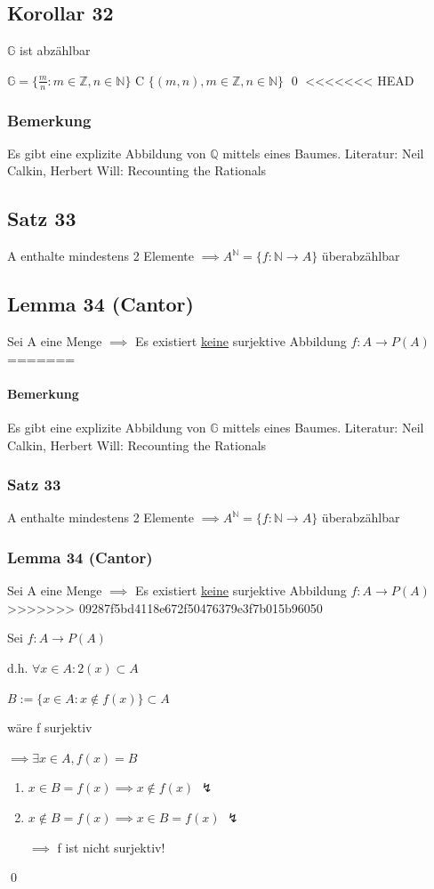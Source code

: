 \documentclass[fleqn]{scrbook}
\newcommand{\qq}[1]{\glqq #1\grqq}
\renewenvironment{proof}{{\bfseries Beweis }}{\qed}
\begin{document}
\subsection{Korollar 32}

$\mathbb{G}$ ist abzählbar

\begin{proof}
$\mathbb{G} = \{ \frac{m}{n}: m \in \mathbb{Z}, n \in \mathbb{N}\}$ \qq C $\{(m,n), m \in \mathbb{Z}, n \in \mathbb{N}\}$
\end{proof}
<<<<<<< HEAD
\subsubsection{Bemerkung} Es gibt eine explizite Abbildung von $\mathbb{Q}$ mittels eines Baumes. Literatur: Neil Calkin, Herbert Will: Recounting the Rationals
\subsection{Satz 33} A enthalte mindestens 2 Elemente $\implies A^\mathbb{N} = \{ f: \mathbb{N} \rightarrow A\}$ überabzählbar
\subsection{Lemma 34 (Cantor)} Sei A eine Menge $\implies$ Es existiert \underline{keine} surjektive Abbildung $f: A \rightarrow P(A)$
=======
\paragraph{Bemerkung} Es gibt eine explizite Abbildung von $\mathbb{G}$ mittels eines Baumes. Literatur: Neil Calkin, Herbert Will: Recounting the Rationals
\subsubsection{Satz 33} A enthalte mindestens 2 Elemente $\implies A^\mathbb{N} = \{ f: \mathbb{N} \rightarrow A\}$ überabzählbar
\subsubsection{Lemma 34 (Cantor)} Sei A eine Menge $\implies$ Es existiert \underline{keine} surjektive Abbildung $f: A \rightarrow P(A)$
>>>>>>> 09287f5bd4118e672f50476379e3f7b015b96050

\begin{proof}
	Sei $f: A \rightarrow P(A)$
	
	d.h. $\forall x \in A: 2(x) \subset A$
	
	$B:=\{ x \in A: x \notin f(x)\} \subset A$
	
	wäre f surjektiv
	
	$\implies \exists x \in A, f(x) = B$
	
	\begin{enumerate}[1. {Fall}:]
		\item $x \in B = f(x) \implies x \notin f(x)$ $\lightning$
		
		\item $x \notin B = f(x) \implies x \in B = f(x)$ $\lightning$
		
			$\implies$ f ist nicht surjektiv!
	\end{enumerate}
\end{proof}
\end{document}
